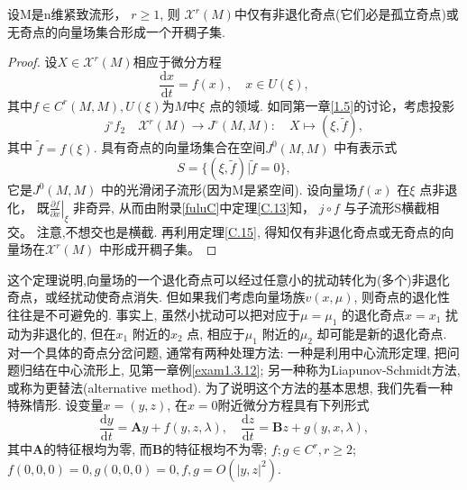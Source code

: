 \begin{theorem}\label{thm2.1.4}
  设M是n维紧致流形，
  \(r \geqslant 1\),
  则
  \(\mathscr{X}^{r}(M)\)中仅有非退化奇点(它们必是孤立奇点)或无奇点的向量场集合形成一个开稠子集.
\end{theorem}
\begin{proof}
  设$X \in \mathscr{X}^{r}(M)$相应于微分方程
  \begin{equation}
\frac{\mathrm{d} x}{\mathrm{d} t}=f(x), \quad x \in U(\xi),
\end{equation}
其中\(f \in C^{r}(M, M), U(\xi)\)为\(M\)中\(\xi\) 点的领域.
如同第一章\ref{1.5}的讨论，考虑投影
\begin{equation*}
j^{\circ} f_{2} \quad \mathscr{X}^{r}(M) \rightarrow J^{\circ}(M, M) : \quad X \mapsto(\xi, \tilde{f}),
\end{equation*}
其中
\(\tilde{f}=f(\xi)\).
具有奇点的向量场集合在空间\(J^{0}(M, M)\) 中有表示式
\begin{equation*}
S=\{(\xi, \tilde{f}) | \tilde{f}=0\},
\end{equation*}
它是\(J^{0}(M, M)\) 中的光滑闭子流形(因为M是紧空间).
设向量场\(f(x)\) 在\(\xi\) 点非退化，
既\(\left.\frac{\partial f}{\partial x}\right|_{\xi}\) 非奇异,
从而由附录\ref{fuluC}中定理\ref{C.13}知，
\(j {\circ} f\) 与子流形S横截相交。
注意,不想交也是横截.
再利用定理\ref{C.15},
得知仅有非退化奇点或无奇点的向量场在\(\mathscr{X}^{r}(M)\) 中形成开稠子集。
\end{proof}
\par
这个定理说明,向量场的一个退化奇点可以经过任意小的扰动转化为(多个)非退化奇点，或经扰动使奇点消失.
但如果我们考虑向量场族\(v(x,\mu)\),
则奇点的退化性往往是不可避免的.
事实上,
虽然小扰动可以把对应于\(\mu=\mu_{1}\) 的退化奇点\(x=x_{1}\) 扰动为非退化的,
但在\(x_{1}\) 附近的\(x_{2}\) 点,
相应于\(\mu_{1}\) 附近的\(\mu_{2}\) 却可能是新的退化奇点.
对一个具体的奇点分岔问题,
通常有两种处理方法:
一种是利用中心流形定理,
把问题归结在中心流形上,
见第一章例\ref{exam1.3.12};
另一种称为Liapunov-Schmidt方法,
或称为更替法(alternative method).
为了说明这个方法的基本思想,
我们先看一种特殊情形.
设变量\(x=(y,z)\),
在\(x=0\)附近微分方程具有下列形式
\begin{equation}
  \label{eq2.1.2}
  \frac{\mathrm{d} y}{\mathrm{d} t}=\boldsymbol{A} y+f(y, z, \lambda),
  \quad
  \frac{\mathrm{d} z}{\mathrm{d} t}=\boldsymbol{B} z+g(y, x, \lambda),
  \end{equation}
  其中\(\boldsymbol{A}\)的特征根均为零,
  而\(\boldsymbol{B}\)的特征根均不为零;
  \(f ; g \in C^{r}, r \geqslant 2\);
  \( f(0,0,0)=0, g(0,0,0)=0, f, g=O\left(|y, z|^{2}\right)\).
